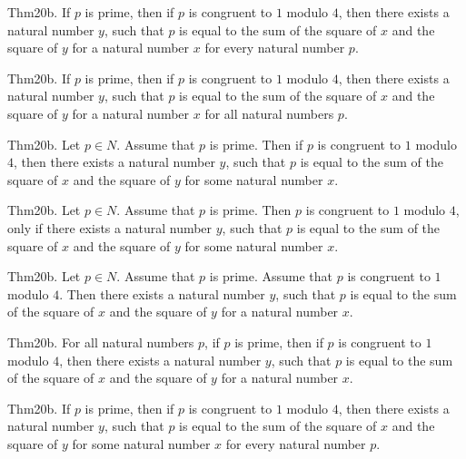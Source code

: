 \documentclass{article}
\begin{document}
Thm20b. If $p$ is prime, then if $p$ is congruent to $1$ modulo $4$, then there exists a natural number $y$, such that $p$ is equal to the sum of the square of $x$ and the square of $y$ for a natural number $x$ for every natural number $p$.

Thm20b. If $p$ is prime, then if $p$ is congruent to $1$ modulo $4$, then there exists a natural number $y$, such that $p$ is equal to the sum of the square of $x$ and the square of $y$ for a natural number $x$ for all natural numbers $p$.

Thm20b. Let $p \in N$. Assume that $p$ is prime. Then if $p$ is congruent to $1$ modulo $4$, then there exists a natural number $y$, such that $p$ is equal to the sum of the square of $x$ and the square of $y$ for some natural number $x$.

Thm20b. Let $p \in N$. Assume that $p$ is prime. Then $p$ is congruent to $1$ modulo $4$, only if there exists a natural number $y$, such that $p$ is equal to the sum of the square of $x$ and the square of $y$ for some natural number $x$.

Thm20b. Let $p \in N$. Assume that $p$ is prime. Assume that $p$ is congruent to $1$ modulo $4$. Then there exists a natural number $y$, such that $p$ is equal to the sum of the square of $x$ and the square of $y$ for a natural number $x$.

Thm20b. For all natural numbers $p$, if $p$ is prime, then if $p$ is congruent to $1$ modulo $4$, then there exists a natural number $y$, such that $p$ is equal to the sum of the square of $x$ and the square of $y$ for a natural number $x$.

Thm20b. If $p$ is prime, then if $p$ is congruent to $1$ modulo $4$, then there exists a natural number $y$, such that $p$ is equal to the sum of the square of $x$ and the square of $y$ for some natural number $x$ for every natural number $p$.
\end{document}
